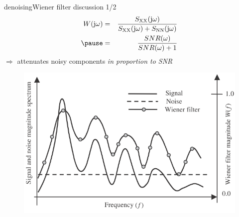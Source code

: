 	\begin{frame}{denoising}{Wiener filter discussion 1/2}
      \vspace{-5mm} \begin{eqnarray*}
            W(\jom) &=& \frac{S_\mathrm{XX}(\jom)}{{S}_\mathrm{XX}(\jom) + {S}_\mathrm{NN}(\jom)}\\
            \pause
            &=& \frac{SNR(\omega)}{SNR(\omega) + 1}
        \end{eqnarray*}
        \smallskip
        $\Rightarrow$ attenuates noisy components \textit{in proportion to SNR}
        \begin{figure}
            \includegraphics[scale=.4]{graph/Wiener}
        \end{figure}
 	\end{frame}

